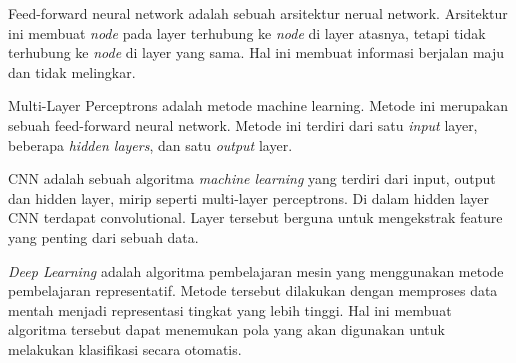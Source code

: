 \documentclass[12pt, a4paper, twoside]{article}
\begin{document}
Feed-forward neural network adalah sebuah arsitektur nerual network. Arsitektur ini membuat \textit{node} pada layer terhubung ke \textit{node} di layer atasnya, tetapi tidak terhubung ke \textit{node} di layer yang sama. Hal ini membuat informasi berjalan maju dan tidak melingkar. \cite{Schmidt.1992}

Multi-Layer Perceptrons adalah metode machine learning. Metode ini merupakan sebuah feed-forward neural network. Metode ini terdiri dari satu \textit{input} layer, beberapa \textit{hidden layers}, dan satu \textit{output} layer. \cite{Riedmiller.1994}

CNN adalah sebuah algoritma \textit{machine learning} yang terdiri dari input, output dan hidden layer, mirip seperti multi-layer perceptrons. Di dalam hidden layer CNN terdapat convolutional. Layer tersebut berguna untuk mengekstrak feature yang penting dari sebuah data. \cite{Valueva.2020}

\textit{Deep Learning} adalah algoritma pembelajaran mesin yang menggunakan metode pembelajaran representatif. Metode tersebut dilakukan dengan memproses data mentah menjadi representasi tingkat yang lebih tinggi. Hal ini membuat algoritma tersebut dapat menemukan pola yang akan digunakan untuk melakukan klasifikasi secara otomatis. \cite{LeCun.2015}

\printbibliography[title = Daftar Pustaka]
\end{document}
